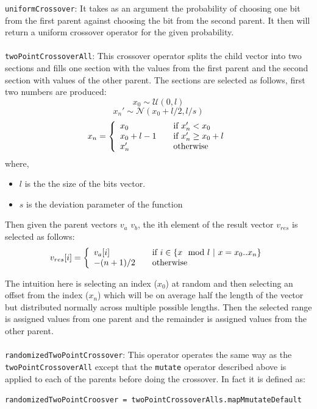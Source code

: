 \documentclass[10pt]{article}
\begin{document}
\verb+uniformCrossover+: It takes as an argument the probability of choosing one bit from the first parent against choosing the bit from the second parent. It then will return a uniform crossover operator for the given probability.
\\\\
\verb+twoPointCrossoverAll+: This crossover operator splits the child vector into two sections and fills one section with the values from the first parent and the second section with values of the other parent. The sections are selected as follows, first two numbers are produced:
\[
x_0 \sim \mathcal{U}(0,l)
\]
\[
x_n' \sim \mathcal{N}(x_0 + l/2,l/s)
\]
\[
x_n = \left\{
    \begin{array}{l l}
    x_0 & \quad \text{if $x_n' < x_0$}\\
    x_0+l-1 & \quad \text{if $x_n' \geq x_0 + l$}\\
    x_n' & \quad \text{otherwise}
    \end{array} \right.
\]
where,
\begin{itemize}
\item $l$ is the the size of the bits vector.
\item $s$ is the deviation parameter of the function
\end{itemize}

Then given the parent vectors $v_a$ $v_b$, the ith element of the result vector $v_{res}$ is selected as follows:
\[ v_{res}[i] = \left\{ 
  \begin{array}{l l}
    v_a[i] & \quad \text{if $i \in \{x \mod{l}\ |\ x = x_0 .. x_n \}$}\\
    -(n+1)/2 & \quad \text{otherwise}
  \end{array} \right.
\]

The intuition here is selecting an index ($x_0$) at random and then selecting an offset from the index ($x_n$) which will be on average half the length of the vector but distributed normally across multiple possible lengths. Then the selected range is assigned values from one parent and the remainder is assigned values from the other parent.
\\\\
\verb+randomizedTwoPointCrossover+: This operator operates the same way as the \verb+twoPointCrossoverAll+ except that the \verb+mutate+ operator described above is applied to each of the parents before doing the crossover. In fact it is defined as:
\begin{alltt}
 randomizedTwoPointCroosver\ =\ twoPointCrossoverAll s . mapM mutateDefault
\end{alltt}
\end{document}
